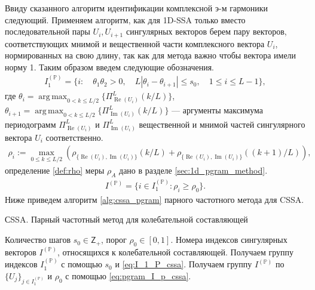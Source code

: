 \documentclass[specialist,
               substylefile = spbu.rtx,
               subf,href,colorlinks=true, 12pt]{disser}
\def\RE{\mathop{\mathrm{Re}}}
\def\argmax{\mathop{\mathrm{argmax}}}
\def\IM{\mathop{\mathrm{Im}}}
\def\argmax{\mathop{\mathrm{arg\,max}}}
\begin{document}
Ввиду сказанного алгоритм идентификации комплексной э-м гармоники следующий. Применяем алгоритм, как для 1D-SSA только вместо последовательной пары $U_i, U_{i+1}$ сингулярных векторов берем пару векторов, соответствующих мнимой и вещественной части  комплексного вектора $U_i$, нормированных на свою длину, так как для метода важно чтобы вектора имели норму 1. 
Таким образом введем следующие обозначения.  
\begin{gather} \label{eq:I_1_P_cssa}
I_1^{(\mathbb{P})} = \{ i: \quad \theta_1 \theta_2 >0, \quad L |\theta_i - \theta_{i+1}| \leqslant s_0, \quad 1 \leqslant i \leqslant L -1  \},
\end{gather}  
где $\theta_i = \argmax_{0 < k \leqslant L/2} \{\Pi_{\RE(U_i)}^L(k/L)\}$, $\theta_{i+1} = \argmax_{0 < k \leqslant L/2} \{\Pi_{\IM(U_i)}^L(k/L)\}$ --- аргументы максимума периодограмм $\Pi_{\RE(U_i)}^L$ и $\Pi_{\IM(U_i)}^L$ вещественной и мнимой частей сингулярного вектора $U_i$ соответственно.
\begin{gather*} 
\rho_{i} := \max_{0 \leqslant k \leqslant L/2}{\left(\rho_{\{\RE(U_i),\IM(U_i)\}}(k/L) + \rho_{\{\RE(U_i),\IM(U_i)\}}((k+1)/L)\right)},
\end{gather*}
определение \ref{def:rho} меры $\rho_A$ дано в разделе \ref{sec:1d_pgram_method}.
\begin{gather} \label{eq:pgram_I_p_cssa}
I^{(\mathbb{P})} = \{ i \in I_1^{(\mathbb{P})}: \rho_{i} \geqslant\rho_0 \}.
\end{gather}
Ниже приведем алгоритм \ref{alg:cssa_pgram} парного частотного метода для CSSA.
\begin{algorithm}[!hhh]
\caption{СSSA. Парный частотный метод для колебательной составляющей}
\label{alg:cssa_pgram}
\begin{algorithmic}[1]
\REQUIRE Количество шагов $s_0 \in \mathsf{Z}_{+}$, порог $\rho_0 \in [0,1]$.
\ENSURE Номера индексов сингулярных векторов $I^{(\mathbb{P})}$, относящихся к колебательной составляющей.
\STATE  Получаем группу индексов $I_1^{(\mathbb{P})}$ с помощью $s_0$ и \eqref{eq:I_1_P_cssa}. 
\STATE Получаем группу $I^{(\mathbb{P})}$ по $\{U_j\}_{j \in I_1^{(\mathbb{P})}}$ и $\rho_0$ с помощью \eqref{eq:pgram_I_p_cssa}.
\end{algorithmic}
\end{algorithm}

\newpage
\end{document}
